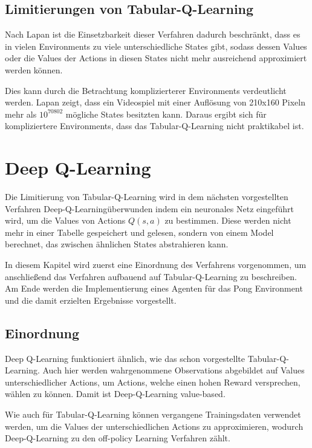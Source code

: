 \documentclass[11pt]{scrartcl}
\begin{document}
\subsection{Limitierungen von Tabular-Q-Learning}
\label{sec:tabular_q_learning_limits}
Nach Lapan\cite[~S.192]{L2018} ist die Einsetzbarkeit dieser Verfahren dadurch
beschränkt, dass es in vielen Environments zu viele unterschiedliche States gibt, sodass
dessen Values oder die Values der Actions in diesen States nicht mehr ausreichend
approximiert werden können.

Dies kann durch die Betrachtung komplizierterer Environments verdeutlicht werden. Lapan
\cite[~S.192]{L2018} zeigt, dass ein Videospiel mit einer Auflösung von 210x160 Pixeln
mehr als $10^{70802}$ mögliche States besitzten kann. Daraus ergibt sich für
kompliziertere Environments, dass das Tabular-Q-Learning nicht praktikabel ist.

\newpage
\section{Deep Q-Learning}
\label{sec:dqn}
Die Limitierung von Tabular-Q-Learning wird in dem nächsten vorgestellten Verfahren \grqq
Deep-Q-Learning\grqq überwunden indem ein neuronales Netz eingeführt wird, um die Values
von Actions $Q(s, a)$ zu bestimmen. Diese werden nicht mehr in einer Tabelle gespeichert
und gelesen, sondern von einem Model berechnet, das zwischen ähnlichen States
abstrahieren kann.

In diesem Kapitel wird zuerst eine Einordnung des Verfahrens vorgenommen, um anschließend
das Verfahren aufbauend auf Tabular-Q-Learning zu beschreiben. Am Ende werden die	
Implementierung eines Agenten für das Pong Environment und die damit erzielten Ergebnisse
vorgestellt.

\subsection{Einordnung}
Deep Q-Learning funktioniert ähnlich, wie das schon vorgestellte Tabular-Q-Learning. Auch
hier werden wahrgenommene Observations abgebildet auf Values unterschiedlicher Actions, um
Actions, welche einen hohen Reward versprechen, wählen zu können. Damit ist
Deep-Q-Learning value-based.

Wie auch für Tabular-Q-Learning können vergangene Trainingsdaten verwendet werden, um die
Values der unterschiedlichen Actions zu approximieren, wodurch Deep-Q-Learning zu den
off-policy Learning Verfahren zählt.
\end{document}
